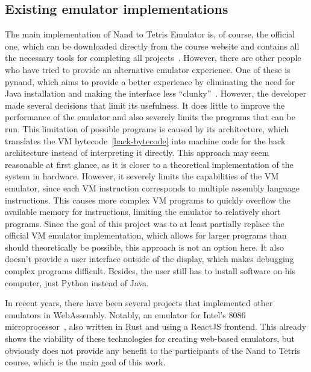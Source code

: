 \subsection{Existing emulator implementations}
The main implementation of Nand to Tetris Emulator is, of course, the official one, which can be downloaded directly from the course website and contains all the necessary tools for completing all projects~\cite[Software]{n2tweb}.
\label{pynand}
However, there are other people who have tried to provide an alternative emulator experience. One of these is pynand, which aims to provide a better experience by eliminating the need for Java installation and making the interface less ``clunky''~\cite{pynand}. However, the developer made several decisions that limit its usefulness. It does little to improve the performance of the emulator and also severely limits the programs that can be run.
This limitation of possible programs is caused by its architecture, which translates the VM bytecode~\ref{hack-bytecode} into machine code for the hack architecture instead of interpreting it directly. This approach may seem reasonable at first glance, as it is closer to a theoretical implementation of the system in hardware. However, it severely limits the capabilities of the VM emulator, since each VM instruction corresponds to multiple assembly language instructions. This causes more complex VM programs to quickly overflow the available memory for instructions, limiting the emulator to relatively short programs.
Since the goal of this project was to at least partially replace the official VM emulator implementation, which allows for larger programs than should theoretically be possible, this approach is not an option here.
It also doesn't provide a user interface outside of the display, which makes debugging complex programs difficult. Besides, the user still has to install software on his computer, just Python instead of Java.


In recent years, there have been several projects that implemented other emulators in WebAssembly. Notably, an emulator for Intel's 8086 microprocessor~\cite{9824078}, also written in Rust and using a ReactJS frontend. This already shows the viability of these technologies for creating web-based emulators, but obviously does not provide any benefit to the participants of the Nand to Tetris course, which is the main goal of this work.

